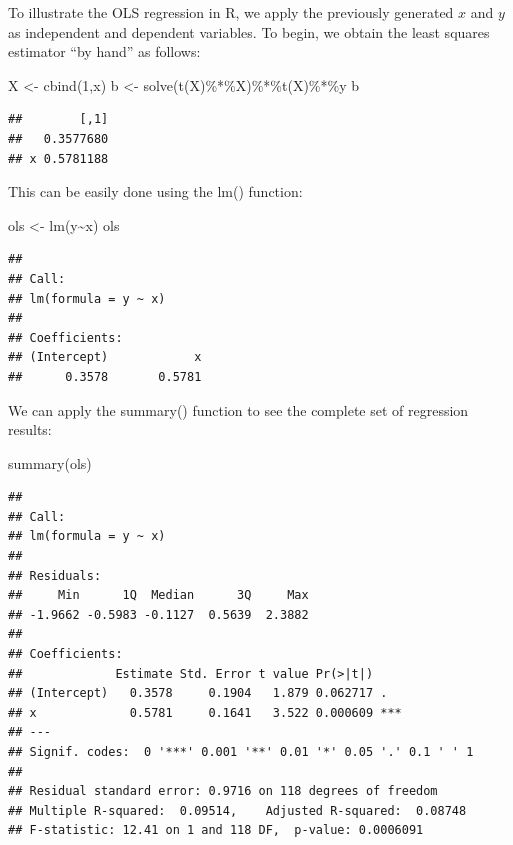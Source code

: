 \documentclass[
  12pt,
  oneside]{book}
\newenvironment{Shaded}{\begin{snugshade}}{\end{snugshade}}
\newcommand{\DecValTok}[1]{\textcolor[rgb]{0.00,0.00,0.81}{#1}}
\newcommand{\FunctionTok}[1]{\textcolor[rgb]{0.00,0.00,0.00}{#1}}
\newcommand{\NormalTok}[1]{#1}
\newcommand{\OtherTok}[1]{\textcolor[rgb]{0.56,0.35,0.01}{#1}}
\newcommand{\SpecialCharTok}[1]{\textcolor[rgb]{0.00,0.00,0.00}{#1}}
\begin{document}
To illustrate the OLS regression in R, we apply the previously generated \(x\) and \(y\) as independent and dependent variables. To begin, we obtain the least squares estimator ``by hand'' as follows:

\begin{Shaded}
\begin{Highlighting}[]
\NormalTok{X }\OtherTok{\textless{}{-}} \FunctionTok{cbind}\NormalTok{(}\DecValTok{1}\NormalTok{,x)}
\NormalTok{b }\OtherTok{\textless{}{-}} \FunctionTok{solve}\NormalTok{(}\FunctionTok{t}\NormalTok{(X)}\SpecialCharTok{\%*\%}\NormalTok{X)}\SpecialCharTok{\%*\%}\FunctionTok{t}\NormalTok{(X)}\SpecialCharTok{\%*\%}\NormalTok{y}
\NormalTok{b}
\end{Highlighting}
\end{Shaded}

\begin{verbatim}
##        [,1]
##   0.3577680
## x 0.5781188
\end{verbatim}

This can be easily done using the lm() function:

\begin{Shaded}
\begin{Highlighting}[]
\NormalTok{ols }\OtherTok{\textless{}{-}} \FunctionTok{lm}\NormalTok{(y}\SpecialCharTok{\textasciitilde{}}\NormalTok{x)}
\NormalTok{ols}
\end{Highlighting}
\end{Shaded}

\begin{verbatim}
## 
## Call:
## lm(formula = y ~ x)
## 
## Coefficients:
## (Intercept)            x  
##      0.3578       0.5781
\end{verbatim}

We can apply the summary() function to see the complete set of regression results:

\begin{Shaded}
\begin{Highlighting}[]
\FunctionTok{summary}\NormalTok{(ols)}
\end{Highlighting}
\end{Shaded}

\begin{verbatim}
## 
## Call:
## lm(formula = y ~ x)
## 
## Residuals:
##     Min      1Q  Median      3Q     Max 
## -1.9662 -0.5983 -0.1127  0.5639  2.3882 
## 
## Coefficients:
##             Estimate Std. Error t value Pr(>|t|)    
## (Intercept)   0.3578     0.1904   1.879 0.062717 .  
## x             0.5781     0.1641   3.522 0.000609 ***
## ---
## Signif. codes:  0 '***' 0.001 '**' 0.01 '*' 0.05 '.' 0.1 ' ' 1
## 
## Residual standard error: 0.9716 on 118 degrees of freedom
## Multiple R-squared:  0.09514,    Adjusted R-squared:  0.08748 
## F-statistic: 12.41 on 1 and 118 DF,  p-value: 0.0006091
\end{verbatim}
\end{document}
